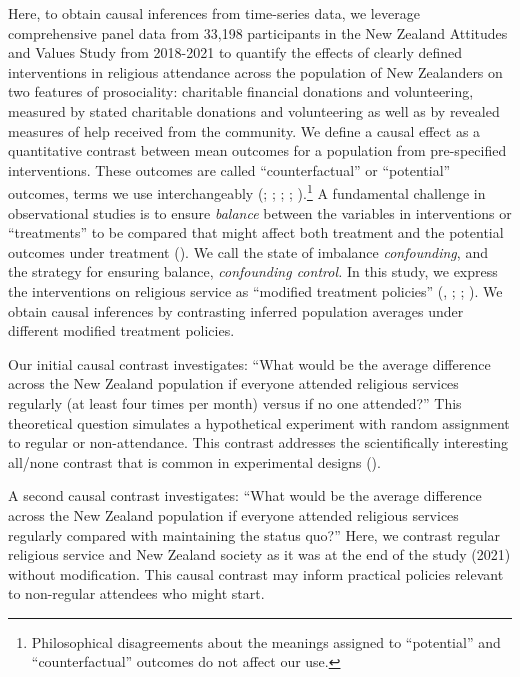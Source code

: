 \documentclass[
  single column]{article}
\begin{document}
Here, to obtain causal inferences from time-series data, we leverage
comprehensive panel data from 33,198 participants in the New Zealand
Attitudes and Values Study from 2018-2021 to quantify the effects of
clearly defined interventions in religious attendance across the
population of New Zealanders on two features of prosociality: charitable
financial donations and volunteering, measured by stated charitable
donations and volunteering as well as by revealed measures of help
received from the community. We define a causal effect as a quantitative
contrast between mean outcomes for a population from pre-specified
interventions. These outcomes are called ``counterfactual'' or
``potential'' outcomes, terms we use interchangeably
(; ; ;
;
).\footnote{Philosophical
  disagreements about the meanings assigned to ``potential'' and
  ``counterfactual'' outcomes do not affect our use.} A fundamental
challenge in observational studies is to ensure \emph{balance} between
the variables in interventions or ``treatments'' to be compared that
might affect both treatment and the potential outcomes under treatment
(). We call the
state of imbalance \emph{confounding}, and the strategy for ensuring
balance, \emph{confounding control.} In this study, we express the
interventions on religious service as ``modified treatment policies''
(,
;
;
). We obtain
causal inferences by contrasting inferred population averages under
different modified treatment policies.

Our initial causal contrast investigates: ``What would be the average
difference across the New Zealand population if everyone attended
religious services regularly (at least four times per month) versus if
no one attended?'' This theoretical question simulates a hypothetical
experiment with random assignment to regular or non-attendance. This
contrast addresses the scientifically interesting all/none contrast that
is common in experimental designs ().

A second causal contrast investigates: ``What would be the average
difference across the New Zealand population if everyone attended
religious services regularly compared with maintaining the status quo?''
Here, we contrast regular religious service and New Zealand society as
it was at the end of the study (2021) without modification. This causal
contrast may inform practical policies relevant to non-regular attendees
who might start.
\end{document}
